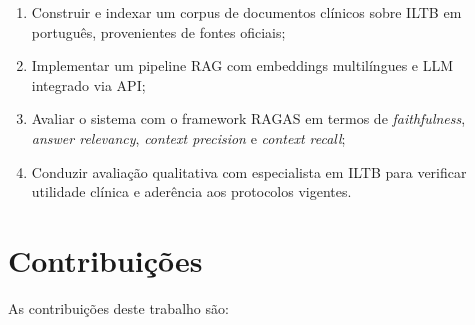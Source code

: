 \documentclass[
  12pt,
  oneside,
  a4paper,
  english,
  brazil
]{abntex2}
\begin{document}
\begin{enumerate}[label=\textbf{OE\arabic*}]
  \item Construir e indexar um corpus de documentos clínicos sobre ILTB em
        português, provenientes de fontes oficiais;
  \item Implementar um pipeline RAG com embeddings multilíngues e LLM integrado
        via API;
  \item Avaliar o sistema com o framework RAGAS em termos de
        \textit{faithfulness}, \textit{answer relevancy}, \textit{context precision}
        e \textit{context recall};
  \item Conduzir avaliação qualitativa com especialista em ILTB para verificar
        utilidade clínica e aderência aos protocolos vigentes.
\end{enumerate}

\section{Contribuições}

As contribuições deste trabalho são:
\end{document}
